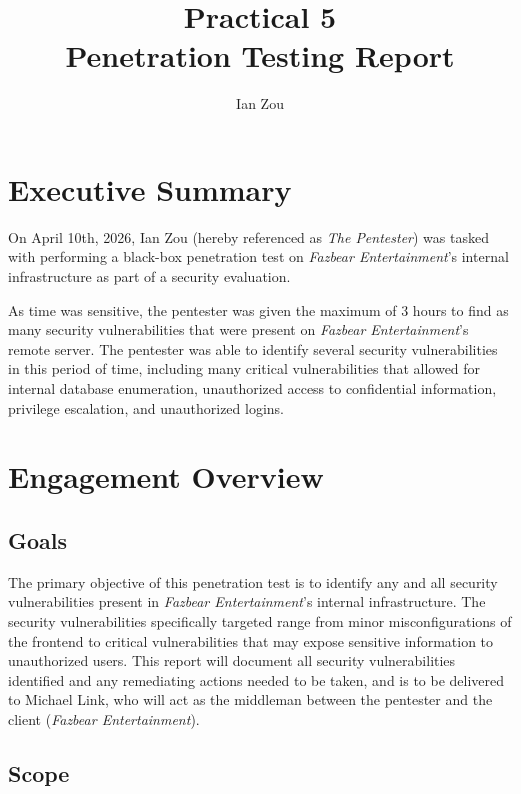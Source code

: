 \documentclass[12pt, letterpaper]{article}
\title{\textbf{Practical 5} \\[1ex] \large Penetration Testing Report}
\author{Ian Zou}
\begin{document}
\maketitle

\tableofcontents

\clearpage
\section{Executive Summary}

On April 10th, 2026, Ian Zou (hereby referenced as \textit{The
Pentester}) was tasked with performing a black-box
penetration test on \textit{Fazbear Entertainment}'s internal
infrastructure as part of a security evaluation. \bigskip

As time was sensitive, the pentester was given the maximum of 3 hours to
find as many security vulnerabilities that were present on
\textit{Fazbear Entertainment}'s remote server. The pentester was able to
identify several security vulnerabilities in this period of time,
including many critical vulnerabilities that allowed for internal
database enumeration, unauthorized access to confidential
information, privilege escalation, and unauthorized logins.

\section{Engagement Overview}

\subsection{Goals}

The primary objective of this penetration test is to identify any and
all security vulnerabilities present in \textit{Fazbear
Entertainment}'s internal infrastructure. The security
vulnerabilities specifically targeted range from minor
misconfigurations of the frontend to critical vulnerabilities that
may expose sensitive information to unauthorized users. This report
will document all security vulnerabilities identified and any
remediating actions needed to be taken, and is to be delivered to
Michael Link, who will act as the middleman between the pentester and the
client (\textit{Fazbear Entertainment}).

\subsection{Scope}
\end{document}
